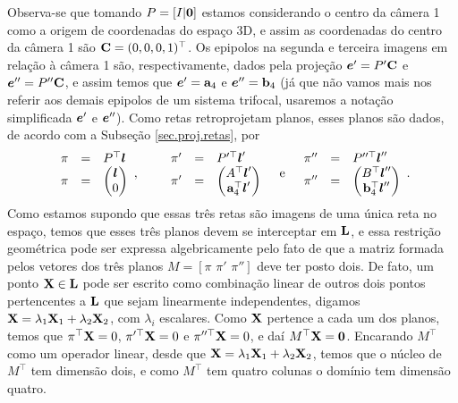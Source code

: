 Observa-se que tomando $P=[I|{\bf 0}]$ estamos considerando o centro da câmera 1 como a origem de coordenadas do espaço 3D, e assim as coordenadas do centro da câmera 1 são ${\bf C}=(0,0,0,1)^\top$. Os epipolos na segunda e terceira imagens em relação à câmera 1 são, respectivamente, dados pela projeção $\boldsymbol{e}'=P'{\bf C}$ e $\boldsymbol{e}''=P''{\bf C}$, e assim temos que $\boldsymbol{e}'={\bf a}_4$ e $\boldsymbol{e}''={\bf b}_4$ (já que não vamos mais nos referir aos demais epipolos de um sistema trifocal, usaremos a notação simplificada $\boldsymbol{e}'$ e $\boldsymbol{e}''$). Como retas retroprojetam planos, esses planos são dados, de acordo com a Subseção \ref{sec.proj.retas}, por
\begin{equation*}
\begin{array}{rcl}
\pi&=&P^\top\boldsymbol{l}\\
\pi&=&
\begin{pmatrix}
\boldsymbol{l}\\
0
\end{pmatrix}
\end{array},\qquad
\begin{array}{rcl}
\pi'&=&P'^\top\boldsymbol{l}'\\
\pi'&=&
\begin{pmatrix}
A^\top\boldsymbol{l}'\\
{\bf a}^\top_4\boldsymbol{l}'
\end{pmatrix}
\end{array}\quad\text{e}\quad
\begin{array}{rcl}
\pi''&=&P''^\top\boldsymbol{l}''\\
\pi''&=&
\begin{pmatrix}
B^\top\boldsymbol{l}''\\
{\bf b}^\top_4\boldsymbol{l}''
\end{pmatrix}
\end{array}.
\end{equation*}
Como estamos supondo que essas três retas são imagens de uma única reta no espaço, temos que esses três planos devem se interceptar em ${\bf L}$, e essa restrição geométrica pode ser expressa algebricamente pelo fato de que a matriz formada pelos vetores dos três planos $M=[\pi \,\,\pi'\,\,\pi'']$ deve ter posto dois. De fato, um ponto $\mathbf{X}\in{\bf L}$ pode ser escrito como combinação linear de outros dois pontos pertencentes a ${\bf L}$ que sejam linearmente independentes, digamos $\mathbf{X}=\lambda_1\mathbf{X}_1+\lambda_2\mathbf{X}_2$, com $\lambda_i$ escalares. Como $\mathbf{X}$ pertence a cada um dos planos, temos que $\pi^\top\mathbf{X}=0$, $\pi'^\top\mathbf{X}=0$ e $\pi''^\top\mathbf{X}=0$, e daí $M^\top\mathbf{X}={\bf 0}$. Encarando $M^\top$ como um operador linear, desde que $\mathbf{X}=\lambda_1\mathbf{X}_1+\lambda_2\mathbf{X}_2$, temos que o núcleo de $M^\top$ tem dimensão dois, e como $M^\top$ tem quatro colunas o domínio tem dimensão quatro. 

